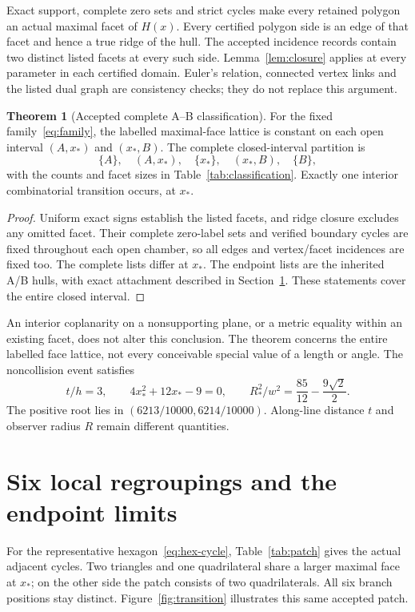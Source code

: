 \documentclass[11pt,a4paper]{article}
\newcommand{\xs}{x_*}
\theoremstyle{definition}
\newtheorem{theorem}{Theorem}
\begin{document}
Exact support, complete zero sets and strict cycles make every retained polygon an actual maximal facet of $H(x)$. Every certified polygon side is an edge of that facet and hence a true ridge of the hull. The accepted incidence records contain two distinct listed facets at every such side. Lemma~\ref{lem:closure} applies at every parameter in each certified domain. Euler's relation, connected vertex links and the listed dual graph are consistency checks; they do not replace this argument.

\begin{theorem}[Accepted complete A--B classification]\label{thm:classification}
For the fixed family~\eqref{eq:family}, the labelled maximal-face lattice is constant on each open interval $(A,\xs)$ and $(\xs,B)$. The complete closed-interval partition is
\begin{equation}\label{eq:partition}
\{A\},\quad(A,\xs),\quad\{\xs\},\quad(\xs,B),\quad\{B\},
\end{equation}
with the counts and facet sizes in Table~\ref{tab:classification}. Exactly one interior combinatorial transition occurs, at $\xs$.
\end{theorem}
\begin{proof}
Uniform exact signs establish the listed facets, and ridge closure excludes any omitted facet. Their complete zero-label sets and verified boundary cycles are fixed throughout each open chamber, so all edges and vertex/facet incidences are fixed too. The complete lists differ at $\xs$. The endpoint lists are the inherited A/B hulls, with exact attachment described in Section~\ref{sec:attachment}. These statements cover the entire closed interval.
\end{proof}


An interior coplanarity on a nonsupporting plane, or a metric equality within an existing facet, does not alter this conclusion. The theorem concerns the entire labelled face lattice, not every conceivable special value of a length or angle. The noncollision event satisfies
\begin{equation}\label{eq:transition-identities}
t/h=3,\qquad 4\xs^2+12\xs-9=0,\qquad
R_*^2/w^2=\frac{85}{12}-\frac{9\sqrt2}{2}.
\end{equation}
The positive root lies in $(6213/10000,6214/10000)$. Along-line distance $t$ and observer radius $R$ remain different quantities.

\clearpage
\section{Six local regroupings and the endpoint limits}\label{sec:attachment}
For the representative hexagon~\eqref{eq:hex-cycle}, Table~\ref{tab:patch} gives the actual adjacent cycles. Two triangles and one quadrilateral share a larger maximal face at $\xs$; on the other side the patch consists of two quadrilaterals. All six branch positions stay distinct. Figure~\ref{fig:transition} illustrates this same accepted patch.

\end{document}
